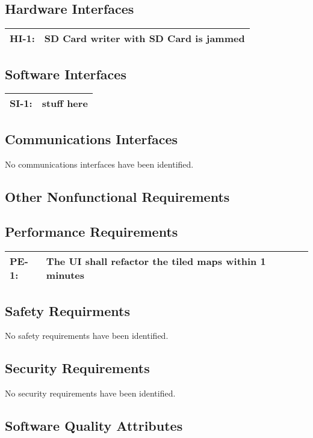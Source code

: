 \documentclass[12pt, letterpaper]{article}
\begin{document}
  \subsection{Hardware Interfaces}
    \begin{tabularx}{\textwidth}{|l|X|}
      \hline
      HI-1: & SD Card writer with SD Card is jammed\\
      \hline
    \end{tabularx}

  \subsection{Software Interfaces}
    \begin{tabularx}{\textwidth}{|l|X|}
      \hline
      SI-1: & stuff here \\
      \hline
    \end{tabularx}

  \subsection{Communications Interfaces}
  No communications interfaces have been identified.

\subsection{Other Nonfunctional Requirements}
  \subsection{Performance Requirements}
    \begin{tabularx}{\textwidth}{|l|X|}
      \hline
      PE-1: & The UI shall refactor the tiled maps within 1 minutes\\ \hline
    \end{tabularx}

  \subsection{Safety Requirments}
  No safety requirements have been identified.
  \subsection{Security Requirements}
  No security requirements have been identified.
  \subsection{Software Quality Attributes}
\end{document}
